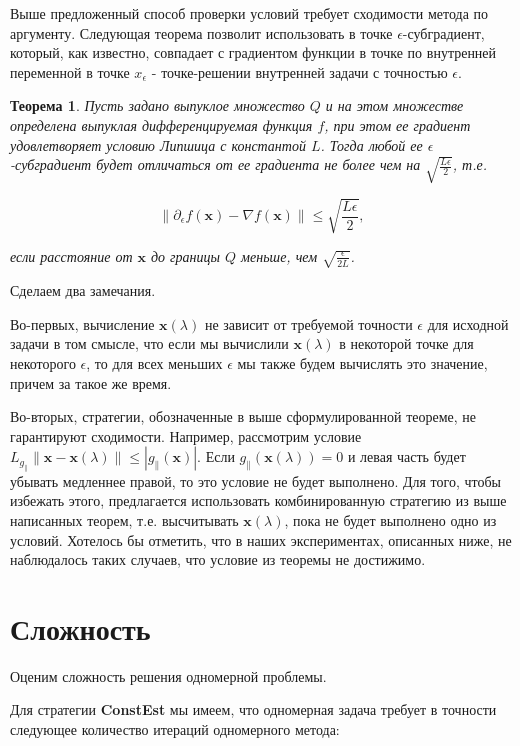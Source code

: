 \documentclass[12pt]{article}
\newtheorem{theorem}{Теорема}[section]
\begin{document}
Выше предложенный способ проверки условий требует сходимости метода по аргументу. Следующая теорема позволит использовать в точке $\epsilon$-субградиент, который, как известно, совпадает с градиентом функции в точке по внутренней переменной в точке $x_\epsilon$ - точке-решении внутренней задачи с точностью $\epsilon$.

\begin{theorem}

Пусть задано выпуклое множество $Q$ и на этом множестве определена выпуклая дифференцируемая функция $f$, при этом ее градиент удовлетворяет условию Липшица с константой $L$. Тогда любой ее $\epsilon$-субградиент будет отличаться от ее градиента не более чем на $\sqrt{\frac{L\epsilon}{2}}$, т.е.

$$\|\partial_\epsilon f(\textbf{x}) - \nabla f(\textbf{x})\| \leq \sqrt{\frac{L\epsilon}{2}},$$

если расстояние от $\textbf{x}$ до границы $Q$ меньше, чем $\sqrt{\frac{\epsilon}{2L}}$.
\end{theorem}

Сделаем два замечания.

Во-первых, вычисление $\textbf{x}(\lambda)$ не зависит от требуемой точности $\epsilon$ для исходной задачи в том смысле, что если мы вычислили $\textbf{x}(\lambda)$ в некоторой точке для некоторого $\epsilon$, то для всех меньших $\epsilon$ мы также будем вычислять это значение, причем за такое же время.

Во-вторых, стратегии, обозначенные в выше сформулированной теореме, не гарантируют сходимости. Например, рассмотрим условие $L_{g_\parallel}\|\textbf{x}-\textbf{x}(\lambda)\|\leq |g_\parallel(\textbf{x})|.$ Если $g_\parallel(\textbf{x}(\lambda))=0$ и левая часть будет убывать медленнее правой, то это условие не будет выполнено. Для того, чтобы избежать этого, предлагается использовать комбинированную стратегию из выше написанных теорем, т.е. высчитывать $\textbf{x}(\lambda)$, пока не будет выполнено одно из условий. Хотелось бы отметить, что в наших экспериментах, описанных ниже, не наблюдалось таких случаев, что условие из теоремы не достижимо.

\section{Сложность}

Оценим сложность решения одномерной проблемы.

Для стратегии \textbf{ConstEst} мы имеем, что одномерная задача требует в точности следующее количество итераций одномерного метода:
\end{document}
